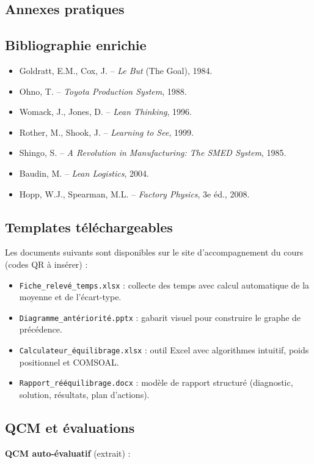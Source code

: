 \documentclass[12pt,a4paper]{article}
\begin{document}
\begin{center}
\section{Annexes pratiques}

\subsection{Bibliographie enrichie}
\begin{itemize}
    \item Goldratt, E.M., Cox, J. – \textit{Le But} (The Goal), 1984.
    \item Ohno, T. – \textit{Toyota Production System}, 1988.
    \item Womack, J., Jones, D. – \textit{Lean Thinking}, 1996.
    \item Rother, M., Shook, J. – \textit{Learning to See}, 1999.
    \item Shingo, S. – \textit{A Revolution in Manufacturing: The SMED System}, 1985.
    \item Baudin, M. – \textit{Lean Logistics}, 2004.
    \item Hopp, W.J., Spearman, M.L. – \textit{Factory Physics}, 3e éd., 2008.
\end{itemize}

\subsection{Templates téléchargeables}
Les documents suivants sont disponibles sur le site d’accompagnement du cours (codes QR à insérer) :
\begin{itemize}
    \item \texttt{Fiche\_relevé\_temps.xlsx} : collecte des temps avec calcul automatique de la moyenne et de l’écart-type.
    \item \texttt{Diagramme\_antériorité.pptx} : gabarit visuel pour construire le graphe de précédence.
    \item \texttt{Calculateur\_équilibrage.xlsx} : outil Excel avec algorithmes intuitif, poids positionnel et COMSOAL.
    \item \texttt{Rapport\_rééquilibrage.docx} : modèle de rapport structuré (diagnostic, solution, résultats, plan d’actions).
\end{itemize}

\subsection{QCM et évaluations}
\textbf{QCM auto-évaluatif} (extrait) :


\end{center}
\end{document}
